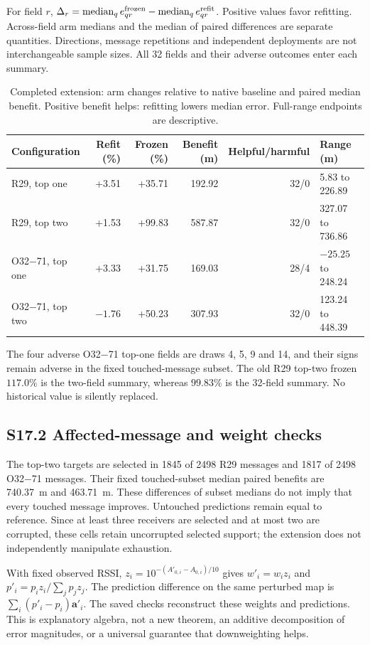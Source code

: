 \documentclass[journal,onecolumn,10pt]{IEEEtran}
\begin{document}
For field $r$, $\Delta_r=\operatorname{median}_q e_{qr}^{\rm frozen}-\operatorname{median}_q e_{qr}^{\rm refit}$. Positive values favor refitting. Across-field arm medians and the median of paired differences are separate quantities. Directions, message repetitions and independent deployments are not interchangeable sample sizes. All 32 fields and their adverse outcomes enter each summary.

\begin{table}[htbp]\centering\small
\caption{Completed extension: arm changes relative to native baseline and paired median benefit. Positive benefit helps: refitting lowers median error. Full-range endpoints are descriptive.}\label{tab:s17summary}
\begin{tabular}{lrrrrl}\toprule
Configuration & Refit (\%)&Frozen (\%)&Benefit (m)&Helpful/harmful&Range (m)\\\midrule
R29, top one&+3.51&+35.71&192.92&32/0&5.83 to 226.89\\
R29, top two&+1.53&+99.83&587.87&32/0&327.07 to 736.86\\
O32$-$71, top one&+3.33&+31.75&169.03&28/4&$-25.25$ to 248.24\\
O32$-$71, top two&$-1.76$&+50.23&307.93&32/0&123.24 to 448.39\\\bottomrule
\end{tabular}\end{table}

The four adverse O32$-$71 top-one fields are draws 4, 5, 9 and 14, and their signs remain adverse in the fixed touched-message subset. The old R29 top-two frozen $117.0\%$ is the two-field summary, whereas $99.83\%$ is the 32-field summary. No historical value is silently replaced.

\subsection*{S17.2 Affected-message and weight checks}
The top-two targets are selected in 1845 of 2498 R29 messages and 1817 of 2498 O32$-$71 messages. Their fixed touched-subset median paired benefits are 740.37~m and 463.71~m. These differences of subset medians do not imply that every touched message improves. Untouched predictions remain equal to reference. Since at least three receivers are selected and at most two are corrupted, these cells retain uncorrupted selected support; the extension does not independently manipulate exhaustion.

With fixed observed RSSI, $z_i=10^{-(A'_{0,i}-A_{0,i})/10}$ gives $w'_i=w_i z_i$ and $p'_i=p_i z_i/\sum_j p_j z_j$. The prediction difference on the same perturbed map is $\sum_i(p'_i-p_i)\mathbf a'_i$. The saved checks reconstruct these weights and predictions. This is explanatory algebra, not a new theorem, an additive decomposition of error magnitudes, or a universal guarantee that downweighting helps.
\end{document}
